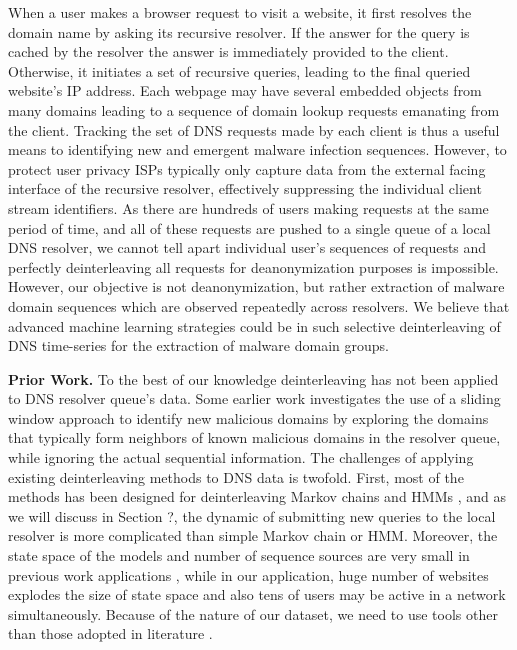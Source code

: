 \documentclass[conference]{IEEEtran}
\begin{document}
	When a user makes a browser request to visit a website, it first
	resolves the domain name by asking its recursive resolver.  If the
	answer for the query is cached by the resolver the answer is
	immediately provided to the client. Otherwise, it initiates a set of
	recursive queries, leading to the final queried website's IP address.
	Each webpage may have several embedded objects from many domains
	leading to a sequence of domain lookup requests emanating from the
	client.  Tracking the set of DNS requests made by each client is thus
	a useful means to identifying new and emergent malware infection
	sequences.  However, to protect user privacy ISPs typically only
	capture data from the external facing interface of the recursive
	resolver, effectively suppressing the individual client stream
	identifiers.  As there are hundreds of users making requests at the
	same period of time, and all of these requests are pushed to a single
	queue of a local DNS resolver, we cannot tell apart individual user's
	sequences of requests and perfectly deinterleaving all requests for
	deanonymization purposes is impossible.  However, our objective is not
	deanonymization, but rather extraction of malware domain sequences
	which are observed repeatedly across resolvers.  We believe that advanced
	machine learning strategies could be  in such selective
	deinterleaving of DNS time-series for the extraction of malware
	domain groups.
	
	
	{\bf Prior Work. } To the best of our knowledge deinterleaving has not
	been applied to DNS resolver queue's data.  Some earlier
	work \cite{gao2013empirical} investigates the use of a sliding window
	approach to identify new malicious domains by exploring the domains
	that typically form neighbors of known malicious domains in the
	resolver queue, while ignoring the actual sequential information.  The
	challenges of applying existing deinterleaving methods to DNS data is
	twofold.  First, most of the methods has been designed for
	deinterleaving Markov chains \cite{batu2004inferring,
		seroussi2009deinterleaving, seroussi2012deinterleaving,
		minot2014separation} and HMMs \cite{landwehr2008modeling}, and as we
	will discuss in Section ?, the dynamic of submitting new queries to
	the local resolver is more complicated than simple Markov chain or
	HMM.  Moreover, the state space of the models and number of sequence
	sources are very small in previous work
	applications \cite{minot2014separation, landwehr2008modeling}, while
	in our application, huge number of websites explodes the size of state
	space and also tens of users may be active in a network
	simultaneously.  Because of the nature of our dataset, we need to use
	tools other than those adopted in
	literature \cite{minot2014separation,
		landwehr2008modeling,burge1998finding, burge1997prediction}.
	
\end{document}
